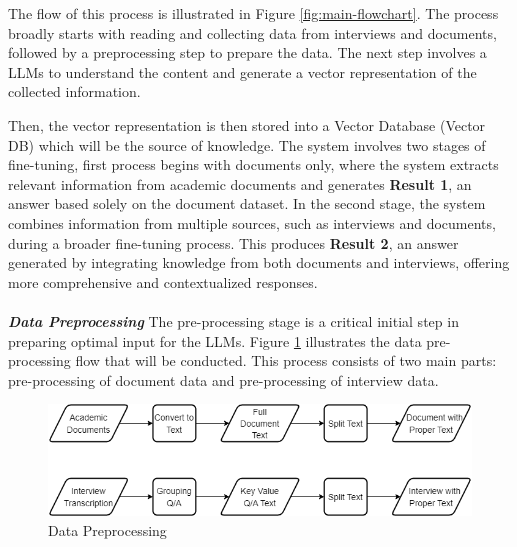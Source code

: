 \documentclass[runningheads]{llncs}
\begin{document}
The flow of this process is illustrated in Figure \ref{fig:main-flowchart}. The process broadly starts with reading and collecting data from interviews and documents, followed by a preprocessing step to prepare the data. The next step involves a LLMs to understand the content and generate a vector representation of the collected information. 

Then, the vector representation is then stored into a Vector Database (Vector DB) which will be the source of knowledge. The system involves two stages of fine-tuning, first process begins with documents only, where the system extracts relevant information from academic documents and generates \textbf{Result 1}, an answer based solely on the document dataset. In the second stage, the system combines information from multiple sources, such as interviews and documents, during a broader fine-tuning process. This produces \textbf{Result 2}, an answer generated by integrating knowledge from both documents and interviews, offering more comprehensive and contextualized responses. \\
\\
\textbf{\textit{Data Preprocessing}} The pre-processing stage is a critical initial step in preparing optimal input for the LLMs. Figure \ref{fig:preprocessing} illustrates the data pre-processing flow that will be conducted. This process consists of two main parts: pre-processing of document data and pre-processing of interview data.

\begin{figure}[htbp]
        \centerline{\includegraphics[scale=0.4]{eng-preproc.png}}
        \caption{Data Preprocessing}
        \label{fig:preprocessing}
    \end{figure}
    
\end{document}
